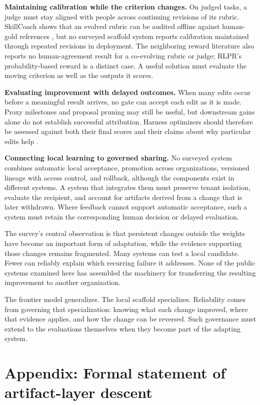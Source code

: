 \textbf{Maintaining calibration while the criterion changes.} On judged tasks, a judge must stay aligned with people across continuing revisions of its rubric. SkillCoach shows that an evolved rubric can be audited offline against human-gold references \cite{zhu2026skillcoach}, but no surveyed scaffold system reports calibration maintained through repeated revisions in deployment. The neighboring reward literature also reports no human-agreement result for a co-evolving rubric or judge; RLPR's probability-based reward is a distinct case. A useful solution must evaluate the moving criterion as well as the outputs it scores.

\textbf{Evaluating improvement with delayed outcomes.} When many edits occur before a meaningful result arrives, no gate can accept each edit as it is made. Proxy milestones and proposal pruning may still be useful, but downstream gains alone do not establish successful attribution. Harness optimizers should therefore be assessed against both their final scores and their claims about why particular edits help \cite{ong2026harnesseval}.

\textbf{Connecting local learning to governed sharing.} No surveyed system combines automatic local acceptance, promotion across organizations, versioned lineage with access control, and rollback, although the components exist in different systems. A system that integrates them must preserve tenant isolation, evaluate the recipient, and account for artifacts derived from a change that is later withdrawn. Where feedback cannot support automatic acceptance, such a system must retain the corresponding human decision or delayed evaluation.

The survey's central observation is that persistent changes outside the weights have become an important form of adaptation, while the evidence supporting those changes remains fragmented. Many systems can test a local candidate. Fewer can reliably explain which recurring failure it addresses. None of the public systems examined here has assembled the machinery for transferring the resulting improvement to another organization.

The frontier model generalizes. The local scaffold specializes. Reliability comes from governing that specialization: knowing what each change improved, where that evidence applies, and how the change can be reversed. Such governance must extend to the evaluations themselves when they become part of the adapting system.

\section{Appendix: Formal statement of artifact-layer descent}\label{app:formal}

